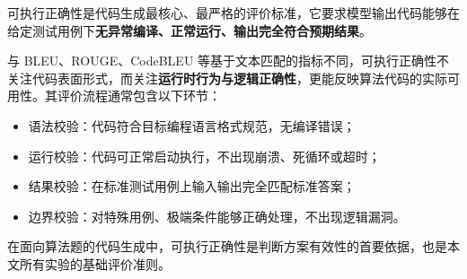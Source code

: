 
可执行正确性是代码生成最核心、最严格的评价标准，它要求模型输出代码能够在给定测试用例下\textbf{无异常编译、正常运行、输出完全符合预期结果}。

与 BLEU、ROUGE、CodeBLEU 等基于文本匹配的指标不同，可执行正确性不关注代码表面形式，而关注\textbf{运行时行为与逻辑正确性}，更能反映算法代码的实际可用性。其评价流程通常包含以下环节：
\begin{itemize}
    \item 语法校验：代码符合目标编程语言格式规范，无编译错误；
    \item 运行校验：代码可正常启动执行，不出现崩溃、死循环或超时；
    \item 结果校验：在标准测试用例上输入输出完全匹配标准答案；
    \item 边界校验：对特殊用例、极端条件能够正确处理，不出现逻辑漏洞。
\end{itemize}
在面向算法题的代码生成中，可执行正确性是判断方案有效性的首要依据，也是本文所有实验的基础评价准则。